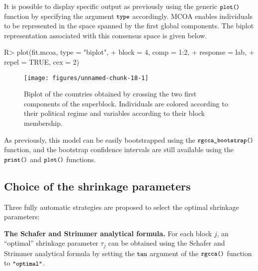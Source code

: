 \documentclass[
]{jss}
\begin{document}
\normalsize

It is possible to display specific output as previously using the
generic \(\small{\texttt{plot()}}\) function by specifying the argument
\(\small{\texttt{type}}\) accordingly. MCOA enables individuals to be
represented in the space spanned by the first global components. The
biplot representation associated with this consensus space is given
below.

\footnotesize

\begin{CodeChunk}
\begin{CodeInput}
R> plot(fit.mcoa, type = "biplot", 
+      block = 4, comp = 1:2, 
+      response = lab, 
+      repel = TRUE, cex = 2)
\end{CodeInput}
\begin{figure}[H]

{\centering \texttt{[image: figures/unnamed-chunk-18-1]} 

}

\caption[Biplot of the countries obtained by crossing the two first components of the superblock]{Biplot of the countries obtained by crossing the two first components of the superblock. Individuals are colored according to their political regime and variables according to their block membership.}\label{fig:unnamed-chunk-18}
\end{figure}
\end{CodeChunk}

\normalsize

As previously, this model can be easily bootstrapped using the
\(\small{\texttt{rgcca\_bootstrap()}}\) function, and the bootstrap
confidence intervals are still available using the
\(\small{\texttt{print()}}\) and \(\small{\texttt{plot()}}\) functions.

\hypertarget{choice-of-the-shrinkage-parameters}{%
\subsection{Choice of the shrinkage
parameters}\label{choice-of-the-shrinkage-parameters}}

Three fully automatic strategies are proposed to select the optimal
shrinkage parameters:

\textbf{The Schafer and Strimmer analytical formula.} For each block
\(j\), an ``optimal'' shrinkage parameter \(\tau_j\) can be obtained
using the Schafer and Strimmer analytical formula \citep{Schafer2005} by
setting the \(\small{\texttt{tau}}\) argument of the
\(\small{\texttt{rgcca()}}\) function to \(\small{\texttt{"optimal"}}\).
\end{document}
